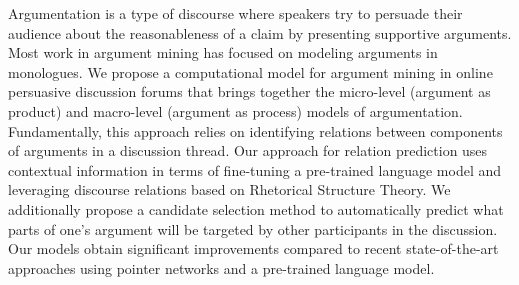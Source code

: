 Argumentation is a type of discourse where speakers try to persuade their audience about the reasonableness of a claim by presenting supportive arguments. Most work in argument mining has focused on modeling arguments in monologues. We propose a computational model for argument mining in online persuasive discussion forums that brings together the micro-level (argument as product) and macro-level (argument as process) models of argumentation. Fundamentally, this approach relies on identifying relations between components of arguments in a discussion thread.  Our approach for relation prediction uses contextual information in terms of fine-tuning a pre-trained language model and leveraging discourse relations based on Rhetorical Structure Theory.  We additionally propose a candidate selection method to automatically predict what parts of one's argument will be targeted by other participants in the discussion. Our models obtain significant improvements compared to recent state-of-the-art approaches using pointer networks and a pre-trained language model.